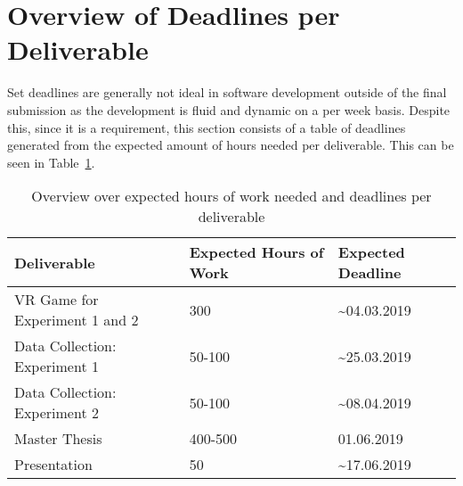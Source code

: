 \section{Overview of Deadlines per Deliverable}
Set deadlines are generally not ideal in software development outside of the final submission as the development is fluid and dynamic on a per week basis. Despite this, since it is a requirement, this section consists of a table of deadlines generated from the expected amount of hours needed per deliverable. This can be seen in Table~\ref{table:deadlines}.

\begin{table}[h!]
\centering
\begin{tabularx}{\textwidth}{|m{6cm}|X|X|} 
\hline
Deliverable & Expected Hours of Work & Expected Deadline\\
\hline
VR Game for Experiment 1 and 2 & 300 & \textasciitilde 04.03.2019\\\hline
Data Collection: Experiment 1 & 50-100 & \textasciitilde 25.03.2019\\\hline
Data Collection: Experiment 2 & 50-100 & \textasciitilde 08.04.2019\\\hline
Master Thesis & 400-500 & 01.06.2019\\\hline
Presentation & 50 & \textasciitilde 17.06.2019\\\hline
\end{tabularx}
\caption{Overview over expected hours of work needed and deadlines per deliverable}
\label{table:deadlines}
\end{table}

